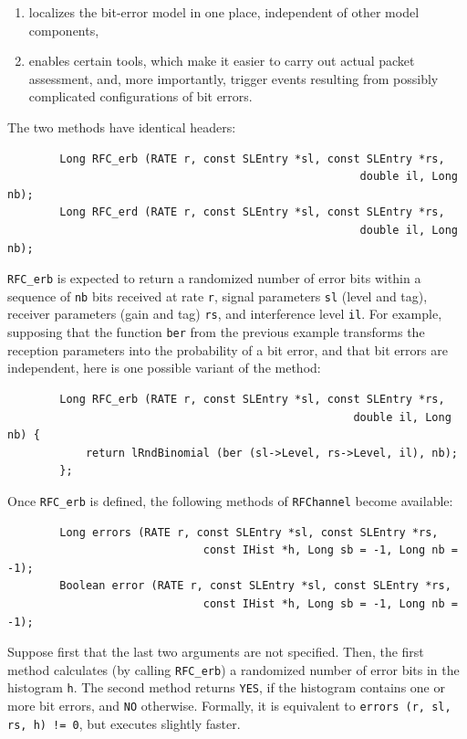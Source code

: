 \begin{enumerate}
\item
localizes the bit-error model in one place, independent of other
model components,
\item
enables certain tools, which make it easier to carry out actual packet
assessment, and, more importantly, trigger events resulting from possibly
complicated configurations of bit errors.
\end{enumerate}

The two methods have identical headers:
\begin{verbatim}
        Long RFC_erb (RATE r, const SLEntry *sl, const SLEntry *rs,
                                                      double il, Long nb);
        Long RFC_erd (RATE r, const SLEntry *sl, const SLEntry *rs,
                                                      double il, Long nb);
\end{verbatim}
\noindent
{\tt RFC\_erb}
is expected to return a randomized number of error bits within a
sequence of {\tt nb} bits received at rate {\tt r},
signal parameters {\tt sl} (level and tag),
receiver parameters (gain and tag) {\tt rs}, and interference level {\tt il}.
For example, supposing that the function {\tt ber} from the previous example
transforms the reception parameters into the probability of a
bit error, and that bit errors are independent, here is one possible
variant of the method:

\begin{verbatim}
        Long RFC_erb (RATE r, const SLEntry *sl, const SLEntry *rs,
                                                     double il, Long nb) {
            return lRndBinomial (ber (sl->Level, rs->Level, il), nb);
        };
\end{verbatim}
\noindent
Once {\tt RFC\_erb} is defined, the following methods of {\tt RFChannel} become
available:

\begin{verbatim}
        Long errors (RATE r, const SLEntry *sl, const SLEntry *rs,
                              const IHist *h, Long sb = -1, Long nb = -1);
        Boolean error (RATE r, const SLEntry *sl, const SLEntry *rs,
                              const IHist *h, Long sb = -1, Long nb = -1);
\end{verbatim}
\noindent
Suppose first that the last two arguments are not specified.
Then, the first method calculates (by calling {\tt RFC\_erb})
a randomized number of error bits in the histogram {\tt h}.
The second method returns {\tt YES}, if the histogram contains one or more
bit errors, and {\tt NO} otherwise.
Formally, it is equivalent to {\tt errors (r, sl, rs, h) != 0}, but
executes slightly faster.

